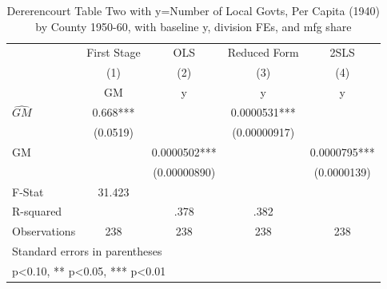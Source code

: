 \begin{table}[htbp]\centering
\def\sym#1{\ifmmode^{#1}\else\(^{#1}\)\fi}
\caption{Dererencourt Table Two with y=Number of Local Govts, Per Capita (1940) by County 1950-60, with baseline y, division FEs, and mfg share}
\begin{tabular}{l*{4}{c}}
\toprule
                    & First Stage   &         OLS   &Reduced Form   &        2SLS   \\
                    &\multicolumn{1}{c}{(1)}&\multicolumn{1}{c}{(2)}&\multicolumn{1}{c}{(3)}&\multicolumn{1}{c}{(4)}\\
                    &\multicolumn{1}{c}{GM}&\multicolumn{1}{c}{y}&\multicolumn{1}{c}{y}&\multicolumn{1}{c}{y}\\
\midrule
$\hat{GM}$          &       0.668***&               &   0.0000531***&               \\
                    &    (0.0519)   &               &(0.00000917)   &               \\
\addlinespace
GM                  &               &   0.0000502***&               &   0.0000795***\\
                    &               &(0.00000890)   &               & (0.0000139)   \\
\midrule
F-Stat              &      31.423   &               &               &               \\
R-squared           &               &        .378   &        .382   &               \\
Observations        &         238   &         238   &         238   &         238   \\
\bottomrule
\multicolumn{5}{l}{\footnotesize Standard errors in parentheses}\\
\multicolumn{5}{l}{\footnotesize * p<0.10, ** p<0.05, *** p<0.01}\\
\end{tabular}
\end{table}
